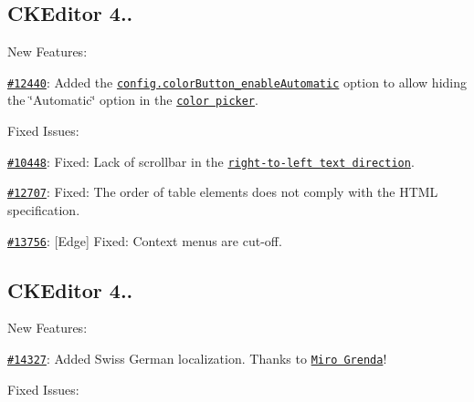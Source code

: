 \subsection*{C\+K\+Editor 4..}

New Features\+:


\begin{DoxyItemize}
\item \href{http://dev.ckeditor.com/ticket/12440}{\tt \#12440}\+: Added the \href{http://docs.ckeditor.com/#!/api/CKEDITOR.config-cfg-colorButton_enableAutomatic}{\tt {\ttfamily config.\+color\+Button\+\_\+enable\+Automatic}} option to allow hiding the \char`\"{}\+Automatic\char`\"{} option in the \href{http://ckeditor.com/addon/colorbutton}{\tt color picker}.
\end{DoxyItemize}

Fixed Issues\+:


\begin{DoxyItemize}
\item \href{http://dev.ckeditor.com/ticket/10448}{\tt \#10448}\+: Fixed\+: Lack of scrollbar in the \href{http://ckeditor.com/addon/bidi}{\tt right-\/to-\/left text direction}.
\item \href{http://dev.ckeditor.com/ticket/12707}{\tt \#12707}\+: Fixed\+: The order of table elements does not comply with the H\+T\+ML specification.
\item \href{http://dev.ckeditor.com/ticket/13756}{\tt \#13756}\+: \mbox{[}Edge\mbox{]} Fixed\+: Context menus are cut-\/off.
\end{DoxyItemize}

\subsection*{C\+K\+Editor 4..}

New Features\+:


\begin{DoxyItemize}
\item \href{http://dev.ckeditor.com/ticket/14327}{\tt \#14327}\+: Added Swiss German localization. Thanks to \href{https://twitter.com/mirogrenda}{\tt Miro Grenda}!
\end{DoxyItemize}

Fixed Issues\+:



